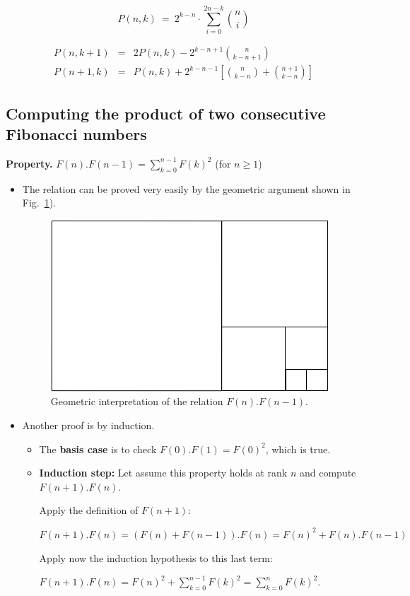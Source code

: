\[ P(n,k) \ = \ 2^{k-n} \cdot \sum_{i=0}^{2n-k} {n \choose i} \]


\begin{eqnarray*}
P(n, k+1) & = & 
  2 P(n,k) - 2^{k-n+1} {n \choose {k-n+1}} \\
P(n+1, k) & = &
  P(n,k) + 2^{k-n-1} \left[ {n \choose {k-n}} + {{n+1} \choose {k-n}} \right]
\end{eqnarray*}



 


\subsection{Computing the product of two consecutive Fibonacci numbers}

\noindent \textbf{Property.} 
\label{prop:FiboSumConsecutive}
$F(n).F(n-1)= \sum_{k=0}^{n-1} F(k)^2$ (for $n \geq 1$)

\begin{itemize}

\item The relation  
can be proved very easily by the geometric argument shown in Fig.~\ref{fig:fibosquare}). 

\begin{figure}[h]
\begin{center}
        \includegraphics[scale=0.5]{FiguresMaths//Fiboembedded}
        \caption{Geometric interpretation of the relation $F(n).F(n-1)$.}
        \label{fig:fibosquare}
\end{center}
\end{figure}

\item
Another proof is by induction.

\begin{itemize}
\item
The \textbf{basis case} is to check $F(0).F(1) = F(0)^2$, which is true.

\item
\textbf{Induction step:} Let assume this property holds at rank $n$ and compute $F(n+1).F(n)$.

Apply the definition of $F(n+1)$:

 $F(n+1).F(n) =  (F(n)+F(n-1)).F(n) = F(n)^2 +  F(n).F(n-1)$
 
 Apply now the induction hypothesis to this last term:
 
 $F(n+1).F(n) = F(n)^2 + \sum_{k=0}^{n-1} F(k)^2 = \sum_{k=0}^{n} F(k)^2$.
 \end{itemize}

\end{itemize}

